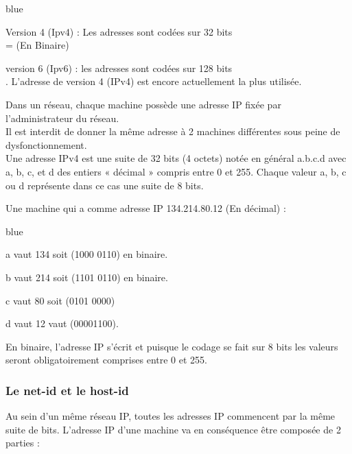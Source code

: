 {\begin{items}{blue}{\Bullet}
	\item Version 4 (Ipv4) : Les adresses sont codées sur 32 bits \\
		
		=  (En Binaire)
	\item version 6 (Ipv6)	: les adresses sont codées sur 128 bits \\
	. 
	L’adresse de version 4 (IPv4) est encore actuellement la plus utilisée. 
\end{items}

Dans un réseau, chaque machine possède une adresse IP fixée par l'administrateur du réseau. \\
Il est interdit de donner la même adresse à 2 machines différentes sous peine de dysfonctionnement.\\

Une adresse IPv4 est une suite de 32 bits (4 octets)  notée en général a.b.c.d avec a, b, c, et d des entiers « décimal » 
compris entre 0 et 255.
 Chaque valeur a, b, c ou d représente dans ce cas une suite de 8 bits. 

 \begin{exemple}
Une machine qui a comme adresse IP 134.214.80.12 (En décimal) :

\begin{items}{blue}{\Bullet}
\item a vaut 134 soit (1000 0110) en binaire.
\item b vaut 214 soit (1101 0110) en binaire. 
\item c vaut 80 soit (0101 0000) 
\item d vaut 12 vaut (00001100).
\end{items}

En binaire, l'adresse IP s'écrit   et puisque le codage se fait sur 
8 bits les valeurs seront obligatoirement comprises entre 0 et 255.
\end{exemple}

\subsubsection{Le net-id et le host-id}

Au sein d'un même réseau IP, toutes les adresses IP commencent par la même suite de bits.
L’adresse IP d’une machine va en conséquence être composée de 2 parties : 

}
